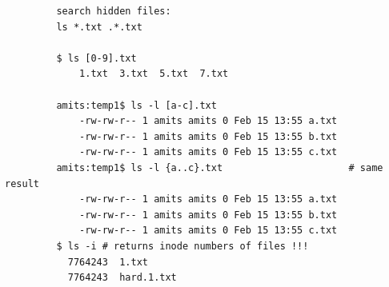\documentclass[a4paper,12pt]{article}
\begin{document}
\begin{verbatim}
         search hidden files:
         ls *.txt .*.txt
         
         $ ls [0-9].txt
             1.txt  3.txt  5.txt  7.txt
             
         amits:temp1$ ls -l [a-c].txt
             -rw-rw-r-- 1 amits amits 0 Feb 15 13:55 a.txt
             -rw-rw-r-- 1 amits amits 0 Feb 15 13:55 b.txt
             -rw-rw-r-- 1 amits amits 0 Feb 15 13:55 c.txt
         amits:temp1$ ls -l {a..c}.txt                      # same result
             -rw-rw-r-- 1 amits amits 0 Feb 15 13:55 a.txt
             -rw-rw-r-- 1 amits amits 0 Feb 15 13:55 b.txt
             -rw-rw-r-- 1 amits amits 0 Feb 15 13:55 c.txt
         $ ls -i # returns inode numbers of files !!!
           7764243  1.txt
           7764243  hard.1.txt
\end{verbatim}
\end{document}
